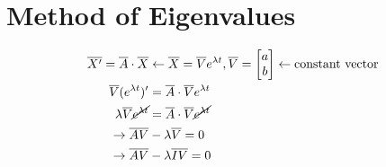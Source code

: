 \documentclass[10pt, letterpaper]{article}
\begin{document}
\section{Method of Eigenvalues}
\begin{align*}
\overline{X'} = \overline{A} \cdot \overline{X} &\leftarrow \overline{X} = \overline{V}e^{\lambda t}, \overline{V} = \begin{bmatrix}
	a\\
	b
\end{bmatrix} \leftarrow \text{constant vector}\\
\overline{V}(e^{\lambda t})' &= \overline{A} \cdot \overline{V}e^{\lambda t}\\
\lambda \overline{V} \cancel{e^{\lambda t}} &= \overline{A} \cdot \overline{V} \cancel{e^{\lambda t}}\\
\rightarrow \overline{A} \overline{V} &- \lambda \overline{V} = 0\\
\rightarrow \overline{A} \overline{V} &- \lambda \overline{I} \overline{V} = 0
\end{align*}
\end{document}
